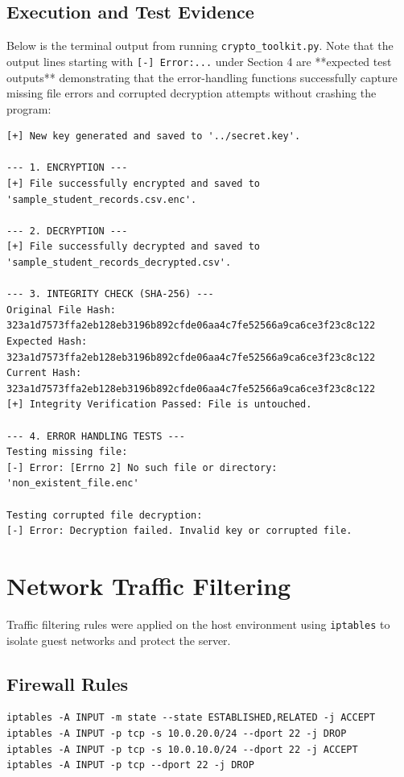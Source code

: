 \documentclass[12pt,a4paper]{article}
\begin{document}
\subsection{Execution and Test Evidence}
Below is the terminal output from running \texttt{crypto\_toolkit.py}. Note that the output lines starting with \texttt{[-] Error:...} under Section 4 are **expected test outputs** demonstrating that the error-handling functions successfully capture missing file errors and corrupted decryption attempts without crashing the program:

\begin{lstlisting}[caption={Python Security Toolkit Execution Output}]
[+] New key generated and saved to '../secret.key'.

--- 1. ENCRYPTION ---
[+] File successfully encrypted and saved to 'sample_student_records.csv.enc'.

--- 2. DECRYPTION ---
[+] File successfully decrypted and saved to 'sample_student_records_decrypted.csv'.

--- 3. INTEGRITY CHECK (SHA-256) ---
Original File Hash: 323a1d7573ffa2eb128eb3196b892cfde06aa4c7fe52566a9ca6ce3f23c8c122
Expected Hash: 323a1d7573ffa2eb128eb3196b892cfde06aa4c7fe52566a9ca6ce3f23c8c122
Current Hash:  323a1d7573ffa2eb128eb3196b892cfde06aa4c7fe52566a9ca6ce3f23c8c122
[+] Integrity Verification Passed: File is untouched.

--- 4. ERROR HANDLING TESTS ---
Testing missing file:
[-] Error: [Errno 2] No such file or directory: 'non_existent_file.enc'

Testing corrupted file decryption:
[-] Error: Decryption failed. Invalid key or corrupted file.
\end{lstlisting}

\section{Network Traffic Filtering}
Traffic filtering rules were applied on the host environment using \texttt{iptables} to isolate guest networks and protect the server.

\subsection{Firewall Rules}
\begin{lstlisting}
iptables -A INPUT -m state --state ESTABLISHED,RELATED -j ACCEPT
iptables -A INPUT -p tcp -s 10.0.20.0/24 --dport 22 -j DROP
iptables -A INPUT -p tcp -s 10.0.10.0/24 --dport 22 -j ACCEPT
iptables -A INPUT -p tcp --dport 22 -j DROP
\end{lstlisting}
\end{document}
